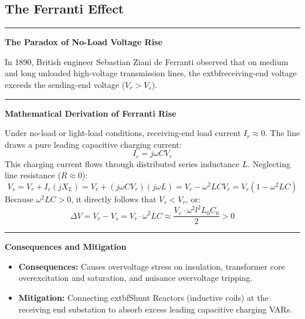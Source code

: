 \documentclass[11pt,a4paper]{article}
\newcommand{\concept}[1]{%
  \vspace{3pt}\noindent\textcolor{AnthGreen}{\rule{3.5pt}{10pt}}\enspace
  \textbf{\sffamily\color{AnthDark}#1}\par\vspace{2pt}%
}
\begin{document}
\subsection{The Ferranti Effect}

\concept{The Paradox of No-Load Voltage Rise}
In 1890, British engineer Sebastian Ziani de Ferranti observed that on medium and long unloaded high-voltage transmission lines, the 	extbf{receiving-end voltage exceeds the sending-end voltage ($V_r > V_s$)}.

\concept{Mathematical Derivation of Ferranti Rise}
Under no-load or light-load conditions, receiving-end load current $I_r \approx 0$. The line draws a pure leading capacitive charging current:
\begin{equation}
  I_c = j \omega C V_r
\end{equation}
This charging current flows through distributed series inductance $L$. Neglecting line resistance ($R \approx 0$):
\begin{equation}
  V_s = V_r + I_c (j X_L) = V_r + (j \omega C V_r)(j \omega L) = V_r - \omega^2 L C V_r = V_r \left( 1 - \omega^2 L C \right)
\end{equation}
Because $\omega^2 L C > 0$, it directly follows that $V_s < V_r$, or:
\begin{equation}
  \Delta V = V_r - V_s = V_r \cdot \omega^2 L C \approx \frac{V_r \cdot \omega^2 l^2 L_0 C_0}{2} > 0
\end{equation}

\begin{center}
\end{center}

\concept{Consequences and Mitigation}
\begin{itemize}
  \item \textbf{Consequences:} Causes overvoltage stress on insulation, transformer core overexcitation and saturation, and nuisance overvoltage tripping.
  \item \textbf{Mitigation:} Connecting 	extbf{Shunt Reactors} (inductive coils) at the receiving end substation to absorb excess leading capacitive charging VARs.
\end{itemize}
\end{document}
